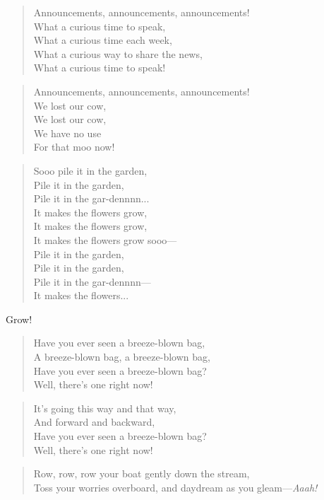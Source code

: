 
\begin{verse}
Announcements, announcements, announcements! \\
What a curious time to speak, \\
What a curious time each week, \\
What a curious way to share the news, \\
What a curious time to speak! \\
\end{verse}

\begin{verse}
Announcements, announcements, announcements! \\
We lost our cow, \\
We lost our cow, \\
We have no use \\
For that moo now! \\
\end{verse}

\begin{verse}
Sooo pile it in the garden, \\
Pile it in the garden, \\
Pile it in the gar-dennnn... \\
It makes the flowers grow, \\
It makes the flowers grow, \\
It makes the flowers grow sooo--- \\
Pile it in the garden, \\
Pile it in the garden, \\
Pile it in the gar-dennnn--- \\
It makes the flowers... \\
\end{verse}

Grow!

\begin{verse}
Have you ever seen a breeze-blown bag, \\
A breeze-blown bag, a breeze-blown bag, \\
Have you ever seen a breeze-blown bag? \\
Well, there's one right now! \\
\end{verse}

\begin{verse}
It's going this way and that way, \\
And forward and backward, \\
Have you ever seen a breeze-blown bag? \\
Well, there's one right now! \\
\end{verse}

\begin{verse}
Row, row, row your boat gently down the stream, \\
Toss your worries overboard, and daydream as you gleam---\textit{Aaah!} \\
\end{verse}
